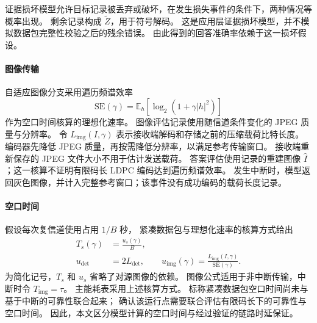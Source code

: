 证据损坏模型允许目标记录被丢弃或破坏，在发生损失事件的条件下，两种情况等概率出现。
剩余记录构成 $\tilde Z$，用于符号解码。
这是应用层证据损坏模型，并不模拟数据包完整性校验之后的残余错误。
由此得到的回答准确率依赖于这一损坏假设。

\paragraph{图像传输}
自适应图像分支采用遍历频谱效率
\begin{equation}
\mathrm{SE}(\gamma)
=\mathbb{E}_{h}[\log_2(1+\gamma|h|^2)]
\end{equation}
作为空口时间核算的理想化速率\cite{tse2005fundamentals}。
图像评估记录使用随信道条件变化的 JPEG 质量与分辨率。
令 $L_{\mathrm{img}}(I,\gamma)$ 表示接收端解码和存储之前的压缩载荷比特长度。
编码器先降低 JPEG 质量，再按需降低分辨率，以满足参考传输窗口。
接收端重新保存的 JPEG 文件大小不用于估计发送载荷。
答案评估使用记录的重建图像 $\hat I$；这一核算不证明有限码长 LDPC 编码达到遍历频谱效率。
发生中断时，模型返回灰色图像，并计入完整参考窗口；该事件没有成功编码的载荷长度记录。

\paragraph{空口时间}
假设每次复信道使用占用 $1/B$ 秒，
紧凑数据包与理想化速率的核算方式给出
\begin{equation}
\begin{aligned}
T_s(\gamma)&=\frac{u_s(\gamma)}{B},\\
u_{\mathrm{det}}&=2L_{\mathrm{det}},\qquad
u_{\mathrm{img}}(\gamma)=
\frac{L_{\mathrm{img}}(I,\gamma)}{\mathrm{SE}(\gamma)}.
\end{aligned}
\end{equation}
为简化记号，$T_s$ 和 $u_s$ 省略了对源图像的依赖。
图像公式适用于非中断传输，中断时令 $T_{\mathrm{img}}=\tau$。
主能耗表采用上述核算方式。
标称紧凑数据包空口时间尚未与基于中断的可靠性联合起来；
确认该运行点需要联合评估有限码长下的可靠性与空口时间。
因此，本文区分模型计算的空口时间与经过验证的链路时延保证。

